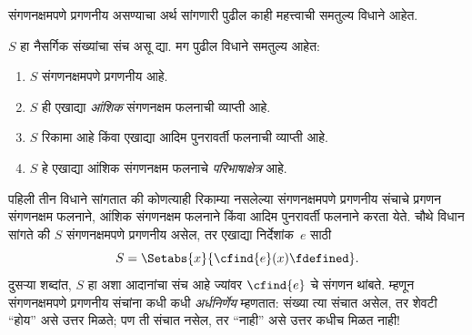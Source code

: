 \documentclass[../../../include/open-logic-section]{subfiles}
\begin{document}



संगणनक्षमपणे प्रगणनीय असण्याचा अर्थ सांगणारी पुढील काही महत्त्वाची
समतुल्य विधाने आहेत.

\begin{thm}
$S$ हा नैसर्गिक संख्यांचा संच असू द्या. मग पुढील विधाने समतुल्य आहेत:
\begin{enumerate}
\item{} $S$ संगणनक्षमपणे प्रगणनीय आहे.
\item{} $S$ ही एखाद्या \emph{आंशिक}
  संगणनक्षम फलनाची व्याप्ती आहे.
\item{} $S$ रिकामा आहे किंवा एखाद्या आदिम
  पुनरावर्ती फलनाची व्याप्ती आहे.
\item{} $S$ हे एखाद्या आंशिक संगणनक्षम
  फलनाचे \emph{परिभाषाक्षेत्र} आहे.
\end{enumerate}
\end{thm}

\begin{explain}
पहिली तीन विधाने सांगतात की कोणत्याही रिकाम्या नसलेल्या
संगणनक्षमपणे प्रगणनीय संचाचे प्रगणन संगणनक्षम फलनाने, आंशिक
संगणनक्षम फलनाने किंवा आदिम पुनरावर्ती फलनाने करता येते.
चौथे विधान सांगते की $S$ संगणनक्षमपणे प्रगणनीय असेल, तर
एखाद्या निर्देशांक~$e$ साठी
\[
S = \Setabs{x}{\cfind{e}(x) \fdefined}.
\]
दुसऱ्या शब्दांत, $S$ हा अशा आदानांचा संच आहे ज्यांवर
$\cfind{e}$ चे संगणन थांबते. म्हणून संगणनक्षमपणे प्रगणनीय
संचांना कधी कधी \emph{अर्धनिर्णेय} म्हणतात: संख्या त्या संचात
असेल, तर शेवटी ``होय'' असे उत्तर मिळते; पण ती संचात नसेल,
तर ``नाही'' असे उत्तर कधीच मिळत नाही!{}
\end{explain}
\end{document}
